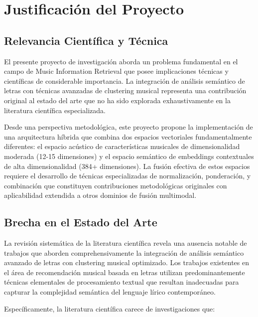 \documentclass[12pt,a4paper]{article}
\begin{document}
\section{Justificación del Proyecto}

\subsection{Relevancia Científica y Técnica}

El presente proyecto de investigación aborda un problema fundamental en el campo de Music Information Retrieval que posee implicaciones técnicas y científicas de considerable importancia. La integración de análisis semántico de letras con técnicas avanzadas de clustering musical representa una contribución original al estado del arte que no ha sido explorada exhaustivamente en la literatura científica especializada.

Desde una perspectiva metodológica, este proyecto propone la implementación de una arquitectura híbrida que combina dos espacios vectoriales fundamentalmente diferentes: el espacio acústico de características musicales de dimensionalidad moderada (12-15 dimensiones) y el espacio semántico de embeddings contextuales de alta dimensionalidad (384+ dimensiones). La fusión efectiva de estos espacios requiere el desarrollo de técnicas especializadas de normalización, ponderación, y combinación que constituyen contribuciones metodológicas originales con aplicabilidad extendida a otros dominios de fusión multimodal.

\subsection{Brecha en el Estado del Arte}

La revisión sistemática de la literatura científica revela una ausencia notable de trabajos que aborden comprehensivamente la integración de análisis semántico avanzado de letras con clustering musical optimizado. Los trabajos existentes en el área de recomendación musical basada en letras utilizan predominantemente técnicas elementales de procesamiento textual que resultan inadecuadas para capturar la complejidad semántica del lenguaje lírico contemporáneo.

Específicamente, la literatura científica carece de investigaciones que:
\end{document}

